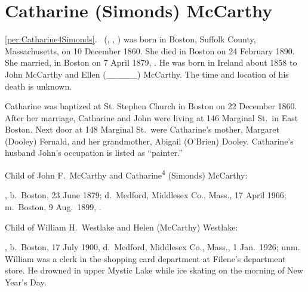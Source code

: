 \section{Catharine (Simonds) McCarthy}

\ref{per:Catharine4Simonds}.\  (, , ) was born in Boston, Suffolk County, Massachusetts, on 10 December 1860.\cite{Catharine4SimondsBirth} She died in Boston on 24 February 1890.\cite{Catharine4SimondsDeath} She married, in Boston on 7 April 1879, .\cite{JohnMcCarthyMarriage} He was born in Ireland about 1858 to John McCarthy and Ellen (\_\_\_\_\_) McCarthy.\cite{JohnMcCarthyMarriage} The time and location of his death is unknown.

Catharine was baptized at St. Stephen Church in Boston on 22 December 1860.\cite{Catharine4SimondsBaptism} After her marriage, Catharine and John were living at 146 Marginal St.\ in East Boston. Next door at 148 Marginal St.\ were Catharine's mother, Margaret (Dooley) Fernald, and her grandmother, Abigail (O'Brien) Dooley. Catharine's husband John's occupation is listed as ``painter.''\cite{Census1880Catharine4Simonds}

\begin{KidsIntro}
	Child of John F.\ McCarthy and Catharine\textsuperscript{4} (Simonds) McCarthy:
\end{KidsIntro}

\begin{Kids}
	, b.\ Boston, 23 June 1879;\cite{Helen5McCarthyBirth} d.\ Medford, Middlesex Co., Mass., 17 April 1966;\cite{Helen5McCarthyDeath} m.\ Boston, 9 Aug.\ 1899, .\cite{Helen5McCarthyMarriage}

\begin{GrandkidsIntro}
	Child of William H.\ Westlake and Helen (McCarthy) Westlake:
\end{GrandkidsIntro}

\begin{Grandkids}		
	, b.\ Boston, 17 July 1900,\cite{William5WestlakeBirth} d.\ Medford, Middlesex Co., Mass., 1 Jan.\ 1926; unm.\cite{William5WestlakeDeath} William was a clerk in the shopping card department at Filene's department store. He drowned in upper Mystic Lake while ice skating on the morning of New Year's Day.\cite{William5WestlakeDeath}
\end{Grandkids}

\end{Kids}


